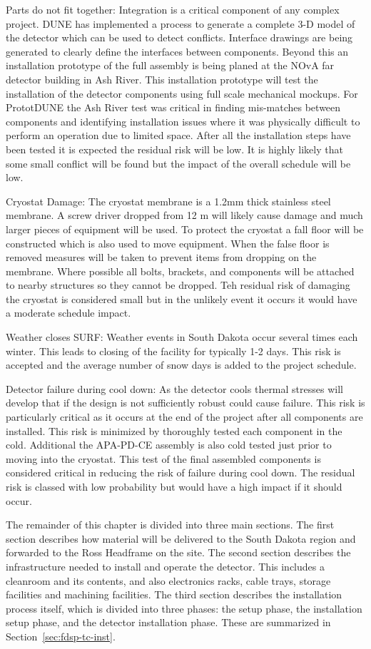 Parts do not fit together:
Integration is a critical component of any complex project. DUNE has implemented a process to generate a complete 3-D model of the detector which can be used to detect conflicts. Interface drawings are being generated to clearly define the interfaces between components. Beyond this an installation prototype of the full assembly is being planed at the NOvA far detector building in Ash River. This installation prototype will test the installation of the detector components using full scale mechanical mockups. For PrototDUNE the Ash River test was critical in finding mis-matches between components and identifying installation issues where it was physically difficult to perform an operation due to limited space. After all the installation steps have been tested it is expected the residual risk will be low. It is highly likely that some small conflict will be found but the impact of the overall schedule will be low.

Cryostat Damage:
The cryostat membrane is a 1.2mm thick stainless steel membrane. A screw driver dropped from 12 m will likely cause damage and much larger pieces of equipment will be used. To protect the cryostat a fall floor will be constructed which is also used to move equipment. When the false floor is removed measures will be taken to prevent items from dropping on the membrane. Where possible all bolts, brackets, and components will be attached to nearby structures so they cannot be dropped. Teh residual risk of damaging the cryostat is considered small but in the unlikely event it occurs it would have a moderate schedule impact.

Weather closes SURF: 
Weather events in South Dakota occur several times each winter. This leads to closing of the facility for typically 1-2 days. This risk is accepted and the average number of snow days is added to the project schedule.

Detector failure during cool down: 
As the detector cools thermal stresses will develop that if the design is not sufficiently robust could cause failure. This risk is particularly critical as it occurs at the end of the project after all components are installed. This risk is minimized by thoroughly tested each component in the cold. Additional the APA-PD-CE assembly is also cold tested just prior to moving into the cryostat. This test of the final assembled components is considered critical in reducing the risk of failure during cool down. The residual risk is classed with low probability but would have a high impact if it should occur.

The remainder of this chapter is divided into three main sections. 
The first section describes how material will be delivered to the South Dakota region and forwarded to the Ross Headframe on the  site. 
The second section describes the infrastructure needed to install and operate the detector. This includes a cleanroom and its contents, and also electronics racks, cable trays, storage facilities and machining facilities. 
The third section describes the installation process itself, which is divided into three phases: the  setup phase, the installation setup phase, and the detector installation phase. These are summarized in Section~\ref{sec:fdsp-tc-inst}. %
